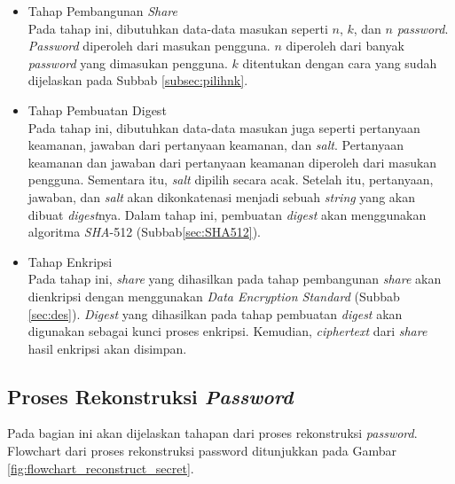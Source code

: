 \begin{itemize}
	\item Tahap Pembangunan \textit{Share} \\
	Pada tahap ini, dibutuhkan data-data masukan seperti $n$, $k$, dan $n$ \textit{password}. \textit{Password} diperoleh dari masukan pengguna. $n$ diperoleh dari banyak \textit{password} yang dimasukan pengguna. $k$ ditentukan dengan cara yang sudah dijelaskan pada Subbab \ref{subsec:pilihnk}.
	\item Tahap Pembuatan Digest \\
	Pada tahap ini, dibutuhkan data-data masukan juga seperti pertanyaan keamanan, jawaban dari pertanyaan keamanan, dan \textit{salt}. Pertanyaan keamanan dan jawaban dari pertanyaan keamanan diperoleh dari masukan pengguna. Sementara itu, \textit{salt} dipilih secara acak. Setelah itu, pertanyaan, jawaban, dan \textit{salt} akan dikonkatenasi menjadi sebuah \textit{string} yang akan dibuat \textit{digest}nya. Dalam tahap ini, pembuatan \textit{digest} akan menggunakan algoritma \textit{SHA}-512 (Subbab\ref{sec:SHA512}).
	\item Tahap Enkripsi \\
	Pada tahap ini, \textit{share} yang dihasilkan pada tahap pembangunan \textit{share} akan dienkripsi dengan menggunakan \textit{Data Encryption Standard} (Subbab \ref{sec:des}). \textit{Digest} yang dihasilkan pada tahap pembuatan \textit{digest} akan digunakan sebagai kunci proses enkripsi. Kemudian, \textit{ciphertext} dari \textit{share} hasil enkripsi akan disimpan.
\end{itemize}

\subsection{Proses Rekonstruksi \textit{Password}}

Pada bagian ini akan dijelaskan tahapan dari proses rekonstruksi \textit{password}. Flowchart dari proses rekonstruksi password ditunjukkan pada Gambar \ref{fig:flowchart_reconstruct_secret}.

